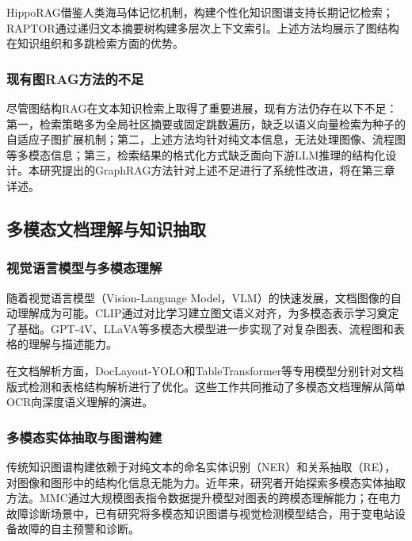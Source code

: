 HippoRAG\cite{gutierrez2024hipporag}借鉴人类海马体记忆机制，构建个性化知识图谱支持长期记忆检索；RAPTOR\cite{sarthi2024raptor}通过递归文本摘要树构建多层次上下文索引。上述方法均展示了图结构在知识组织和多跳检索方面的优势。

\subsubsection{现有图RAG方法的不足}

尽管图结构RAG在文本知识检索上取得了重要进展，现有方法仍存在以下不足：第一，检索策略多为全局社区摘要或固定跳数遍历，缺乏以语义向量检索为种子的自适应子图扩展机制；第二，上述方法均针对纯文本信息，无法处理图像、流程图等多模态信息；第三，检索结果的格式化方式缺乏面向下游LLM推理的结构化设计。本研究提出的GraphRAG方法针对上述不足进行了系统性改进，将在第三章详述。

\subsection{多模态文档理解与知识抽取}

\subsubsection{视觉语言模型与多模态理解}

随着视觉语言模型（Vision-Language Model，VLM）的快速发展，文档图像的自动理解成为可能。CLIP\cite{radford2021clip}通过对比学习建立图文语义对齐，为多模态表示学习奠定了基础。GPT-4V\cite{openai2023gpt4}、LLaVA\cite{liu2023llava}等多模态大模型进一步实现了对复杂图表、流程图和表格的理解与描述能力。

在文档解析方面，DocLayout-YOLO\cite{doclayoutyolo2024}和TableTransformer\cite{smock2022tabletransformer}等专用模型分别针对文档版式检测和表格结构解析进行了优化。这些工作共同推动了多模态文档理解从简单OCR向深度语义理解的演进。

\subsubsection{多模态实体抽取与图谱构建}

传统知识图谱构建依赖于对纯文本的命名实体识别（NER）和关系抽取（RE），对图像和图形中的结构化信息无能为力。近年来，研究者开始探索多模态实体抽取方法。MMC\cite{liu2023mmc}通过大规模图表指令数据提升模型对图表的跨模态理解能力；在电力故障诊断场景中，已有研究将多模态知识图谱与视觉检测模型结合，用于变电站设备故障的自主预警和诊断\cite{xiao2022substationkg}。

